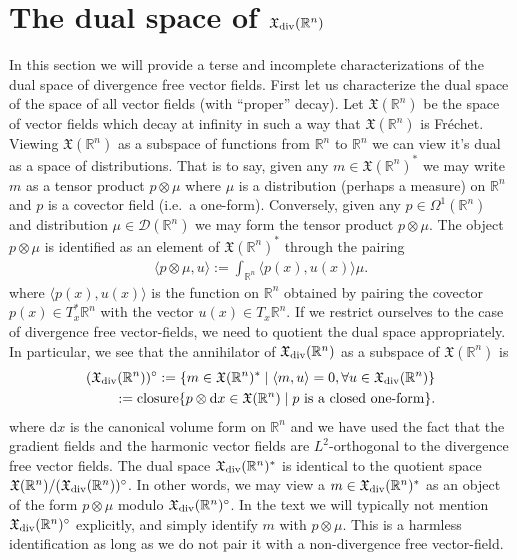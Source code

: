 \documentclass[12pt]{amsart}
\newcommand{\R}{\ensuremath{\mathbb{R}}}
\newcommand{\dx}{\ensuremath{\textrm{d}x}}
\begin{document}
\section{The dual space of $\mathfrak{X}_{\rm div}(\R^n)$}
\label{sec:measure_valued_momap}
In this section we will provide a terse and incomplete
characterizations of the dual space of divergence free 
vector fields.  First let us characterize the dual space of the space of all vector fields (with ``proper'' decay).
Let $\mathfrak{X}(\R^n)$ be the space of vector fields which decay at infinity
in such a way that $\mathfrak{X}(\R^n)$ is Fr\'echet.
Viewing $\mathfrak{X}(\R^n)$ as a subspace of functions from $\R^n$ to $\R^n$
we can view it's dual as a space of distributions.
That is to say, given any $m \in \mathfrak{X}(\R^n)^*$ we may write $m$ as a tensor
product $p \otimes \mu$ where $\mu$ is a distribution (perhaps a measure)
on $\R^n$ and $p$ is a covector field (i.e.\ a one-form).
Conversely, given any $p \in \Omega^1(\R^n)$ and distribution $\mu \in \mathcal{D}(\R^n)$
we may form the tensor product $p \otimes \mu$.
The object $p\otimes \mu$ is identified as an element of $\mathfrak{X}(\R^n)^*$ through
the pairing
\begin{align*}
	\langle p \otimes \mu , u \rangle :=  \int_{\R^n} \langle p(x) , u(x) \rangle \mu.
\end{align*}
where $\langle p(x),u(x) \rangle$ is the function on $\R^n$ obtained by pairing the covector $p(x) \in T_x^*\R^n$ with the vector $u(x) \in T_x\R^n$.
If we restrict ourselves to the case of divergence free vector-fields, we need to quotient
the dual space appropriately.  In particular, we see that the annihilator of $\mathfrak{X}_{\rm div}(\R^n)$
as a subspace of $\mathfrak{X}(\R^n)$ is
\begin{align*}
	(\mathfrak{X}_{\rm div}(\R^n) )^\circ := \{ m \in \mathfrak{X}(\R^n)^* \mid \langle m , u \rangle = 0 , \forall u \in \mathfrak{X}_{\rm div}(\R^n) \}\\
		:= {\rm closure}\{ p \otimes \dx \in \mathfrak{X}(\R^n) \mid p \text{ is a closed one-form} \}.
\end{align*}
where $\dx$ is the canonical volume form on $\R^n$ and
we have used the fact that the gradient fields and the harmonic vector fields are $L^2$-orthogonal to the divergence free vector fields.
The dual space $\mathfrak{X}_{\rm div}(\R^n)^*$ is identical to the quotient space $\mathfrak{X}(\R^n) / (\mathfrak{X}_{\rm div}(\R^n))^\circ$.
In other words, we may view a $m \in \mathfrak{X}_{\rm div}(\R^n)^*$ as an object of the form $p \otimes \mu$ modulo $\mathfrak{X}_{\rm div}(\R^n)^\circ$.
In the text we will typically not mention $\mathfrak{X}_{\rm div}(\R^n)^\circ$ explicitly, and simply identify $m$ with $p \otimes \mu$.
This is a harmless identification as long as we do not pair it with a non-divergence free vector-field.
\end{document}
